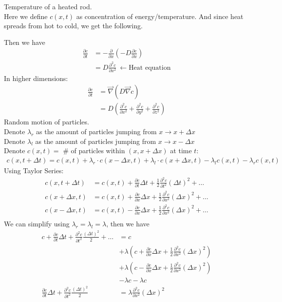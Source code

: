 \documentclass[12pt, letterpaper]{article}
\begin{document}
 Temperature of a heated rod. \\
Here we define $c(x,t)$ as concentration of energy/temperature. And since heat spreads
from hot to cold, we get the following.
\begin{center}
\end{center}
Then we have
\begin{align*}
    \frac{\partial c}{\partial t} &= - \frac{\partial}{\partial x} \left( -D \frac{\partial c}{\partial x} \right)\\
    &= D \frac{\partial^2 c}{\partial x^2}\ \leftarrow \text{Heat equation}
\end{align*}
In higher dimensions: 
\begin{align*}
    \frac{\partial c}{\partial t} &= \vec{\nabla}(D\vec{\nabla}c) \\
    &= D \left( \frac{\partial^2 c}{\partial x^2} + \frac{\partial^2 c}{\partial y^2} + \frac{\partial^2 c}{\partial z^2}\right)
\end{align*}
 Random motion of particles. \\
Denote $\lambda_r$ as the amount of particles jumping from $x \rightarrow x+\Delta x$ \\
Denote $\lambda_l$ as the amount of particles jumping from $x \rightarrow x-\Delta x$ \\
Denote $c(x,t) = $ \# of particles within $(x,x+\Delta x)$ at time $t$: 
\begin{align*}
    c(x,t+\Delta t) = c(x,t) + \lambda_r\cdot c(x-\Delta x,t) + \lambda_l \cdot c(x+\Delta x,t) - \lambda_lc(x,t) - \lambda_rc(x,t)
\end{align*}
Using Taylor Series:
\begin{align*}
    c(x,t+\Delta t) &= c(x,t) + \frac{\partial c}{\partial t} \Delta t + \frac 12 \frac{\partial^2 c}{\partial t^2}(\Delta t)^2 + \dots \\
    c(x+\Delta x,t) &= c(x,t) + \frac{\partial c}{\partial x} \Delta x + \frac 12 \frac{\partial^2 c}{\partial x^2}(\Delta x)^2 + \dots \\
    c(x-\Delta x,t) &= c(x,t) - \frac{\partial c}{\partial x} \Delta x + \frac 12 \frac{\partial^2 c}{\partial x^2}(\Delta x)^2 + \dots \\
\end{align*}
We can simplify using $\lambda_r = \lambda_l = \lambda$, then we have 
\begin{align*}
    c + \frac{\partial c}{\partial t} \Delta t + \frac{\partial^2 c}{\partial t^2}  \frac {(\Delta t)^2}2 + \dots &= c \\
    &+ \lambda \left(c + \frac{\partial c}{\partial x} \Delta x + \frac 12 \frac{\partial^2 c}{\partial x^2}(\Delta x)^2 \right) \\
    &+ \lambda \left(c - \frac{\partial c}{\partial x} \Delta x + \frac 12 \frac{\partial^2 c}{\partial x^2}(\Delta x)^2 \right) \\
    &- \lambda c - \lambda c \\
    \frac{\partial c}{\partial t}\Delta t + \frac{\partial^2 c}{\partial t^2}\frac{(\Delta t)^2}2 &= \lambda \frac{\partial^2c}{\partial x^2}(\Delta x)^2 
\end{align*}
\end{document}

